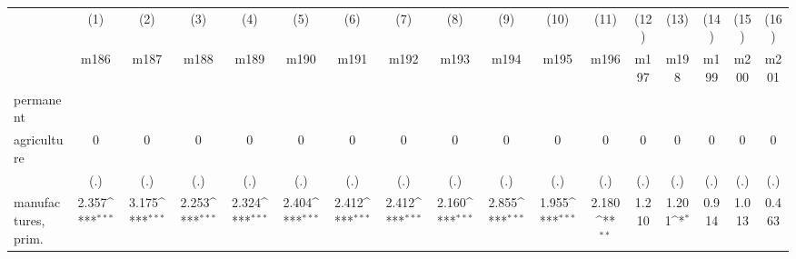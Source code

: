 {
\def\sym#1{\ifmmode^{#1}\else\(^{#1}\)\fi}
\begin{tabular}{l*{16}{c}}
\hline\hline
                    &\multicolumn{1}{c}{(1)}&\multicolumn{1}{c}{(2)}&\multicolumn{1}{c}{(3)}&\multicolumn{1}{c}{(4)}&\multicolumn{1}{c}{(5)}&\multicolumn{1}{c}{(6)}&\multicolumn{1}{c}{(7)}&\multicolumn{1}{c}{(8)}&\multicolumn{1}{c}{(9)}&\multicolumn{1}{c}{(10)}&\multicolumn{1}{c}{(11)}&\multicolumn{1}{c}{(12)}&\multicolumn{1}{c}{(13)}&\multicolumn{1}{c}{(14)}&\multicolumn{1}{c}{(15)}&\multicolumn{1}{c}{(16)}\\
                    &\multicolumn{1}{c}{m186}&\multicolumn{1}{c}{m187}&\multicolumn{1}{c}{m188}&\multicolumn{1}{c}{m189}&\multicolumn{1}{c}{m190}&\multicolumn{1}{c}{m191}&\multicolumn{1}{c}{m192}&\multicolumn{1}{c}{m193}&\multicolumn{1}{c}{m194}&\multicolumn{1}{c}{m195}&\multicolumn{1}{c}{m196}&\multicolumn{1}{c}{m197}&\multicolumn{1}{c}{m198}&\multicolumn{1}{c}{m199}&\multicolumn{1}{c}{m200}&\multicolumn{1}{c}{m201}\\
\hline
permanent           &                     &                     &                     &                     &                     &                     &                     &                     &                     &                     &                     &                     &                     &                     &                     &                     \\
agriculture         &           0         &           0         &           0         &           0         &           0         &           0         &           0         &           0         &           0         &           0         &           0         &           0         &           0         &           0         &           0         &           0         \\
                    &         (.)         &         (.)         &         (.)         &         (.)         &         (.)         &         (.)         &         (.)         &         (.)         &         (.)         &         (.)         &         (.)         &         (.)         &         (.)         &         (.)         &         (.)         &         (.)         \\
[1em]
manufactures, prim. &       2.357\sym{***}&       3.175\sym{***}&       2.253\sym{***}&       2.324\sym{***}&       2.404\sym{***}&       2.412\sym{***}&       2.412\sym{***}&       2.160\sym{***}&       2.855\sym{***}&       1.955\sym{***}&       2.180\sym{**} &       1.210         &       1.201\sym{*}  &       0.914         &       1.013         &       0.463         \\

\end{tabular}}
